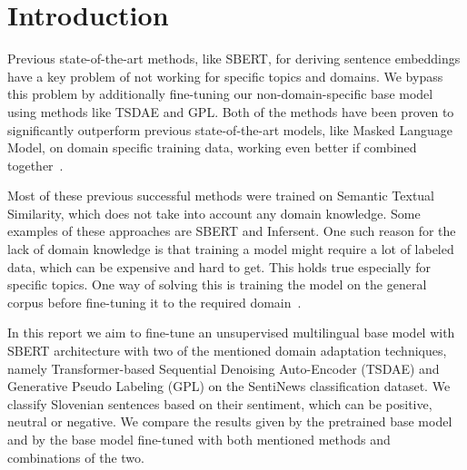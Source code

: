 \documentclass[fleqn,moreauthors,10pt]{ds_report}
\affiliation{\textit{Advisors: Boshko Koloski, Aleš Žagar, Slavko Žitnik}}
\begin{document}
\flushbottom

\maketitle

\thispagestyle{empty}


\section*{Introduction}

Previous state-of-the-art methods, like SBERT, for deriving sentence embeddings have a key problem of not working for specific topics and domains. We bypass this problem by additionally fine-tuning our non-domain-specific base model using methods like TSDAE and GPL. Both of the methods have been proven to significantly outperform previous state-of-the-art models, like Masked Language Model, on domain specific training data, working even better if combined together~\cite{wang-etal-2021-tsdae-using, GPL}.

Most of these previous successful methods were trained on Semantic Textual Similarity, which does not take into account any domain knowledge. Some examples of these approaches are SBERT and Infersent. One such reason for the lack of domain knowledge is that training a model might require a lot of labeled data, which can be expensive and hard to get. This holds true especially for specific topics. One way of solving this is training the model on the general corpus before fine-tuning it to the required domain~\cite{wang-etal-2021-tsdae-using, GPL}.

In this report we aim to fine-tune an unsupervised multilingual base model with SBERT architecture with two of the mentioned domain adaptation techniques, namely Transformer-based Sequential Denoising Auto-Encoder (TSDAE) and Generative Pseudo Labeling (GPL) on the SentiNews classification dataset. We classify Slovenian sentences based on their sentiment, which can be positive, neutral or negative. We compare the results given by the pretrained base model and by the base model fine-tuned with both mentioned methods and combinations of the two.
\end{document}
